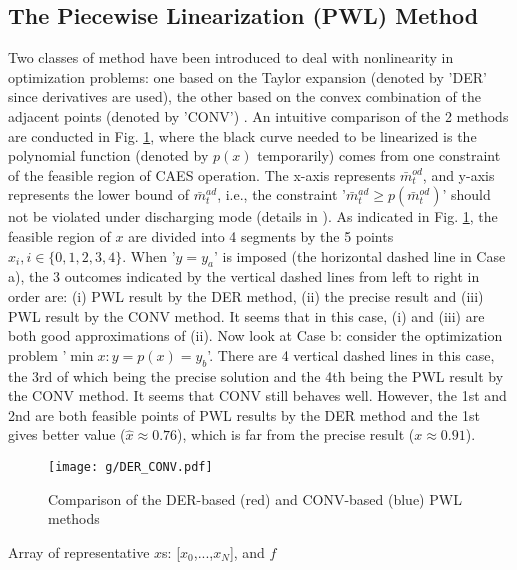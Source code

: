 \documentclass[journal,twoside,web]{ieeecolor}
\begin{document}
\subsection{The Piecewise Linearization (PWL) Method}
Two classes of method have been introduced to deal with nonlinearity in optimization problems: one based on the Taylor expansion \cite{taylor} (denoted by 'DER' since derivatives are used), the other based on the convex combination of the adjacent points (denoted by 'CONV') \cite{bet_pwl}.
An intuitive comparison of the 2 methods are conducted in Fig. \ref{der_conv}, where the black curve needed to be linearized is the polynomial function (denoted by $p(x)$ temporarily) comes from one constraint of the feasible region of CAES operation. The x-axis represents $\bar m^{od}_t$, and y-axis represents the lower bound of $\bar m^{ad}_t$, i.e., the constraint '$\bar m^{ad}_t \ge p(\bar m^{od}_t)$' should not be violated under discharging mode (details in \cite{AACAES}).
As indicated in Fig. \ref{der_conv}, the feasible region of $x$ are divided into 4 segments by the 5 points $x_i,i\in \{0,1,2,3,4\}$.
When '$y=y_a$' is imposed (the horizontal dashed line in Case a), the 3 outcomes indicated by the vertical dashed lines from left to right in order are: (i) PWL result by the DER method, (ii) the precise result and (iii) PWL result by the CONV method. 
It seems that in this case, (i) and (iii) are both good approximations of (ii).
Now look at Case b: consider the optimization problem '$\min x: y=p(x)=y_b$'.
There are 4 vertical dashed lines in this case, the 3rd of which being the precise solution and the 4th being the PWL result by the CONV method.
It seems that CONV still behaves well.
However, the 1st and 2nd are both feasible points of PWL results by the DER method and the 1st gives better value ($\hat{x} \approx 0.76$), which is far from the precise result ($x\approx0.91$).
\begin{figure}[htbp]
    \centering
    \texttt{[image: g/DER\_CONV.pdf]}
    \caption{Comparison of the DER-based (red) and CONV-based (blue) PWL methods }
    \label{der_conv}
\end{figure}
\begin{algorithm}[htbp]\footnotesize
\caption{$y=f(x)\overset{PWL}{\rightarrow}y=f^{PWL}(x)$}\label{pwl1d} 
\begin{algorithmic}[1]
\REQUIRE Array of representative $x$s: [$x_0$,...,$x_N$], and $f$
\label{line3}
\label{line6}
\ENDIF
\ENDFOR
\end{algorithmic}
\end{algorithm}
\end{document}
